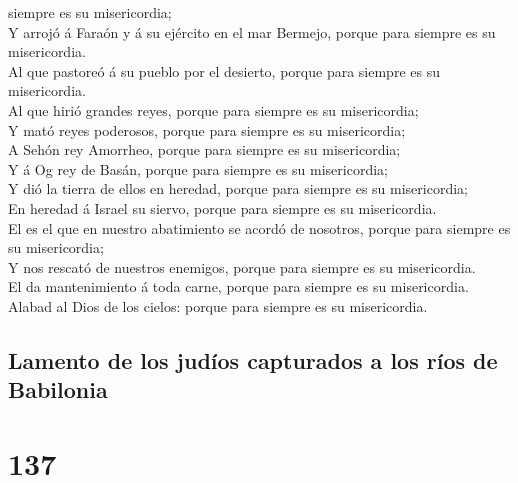 siempre es su misericordia;\\
 Y arrojó á Faraón y á su ejército en el mar Bermejo,
porque para siempre es su misericordia.\\
 Al que pastoreó á su pueblo por el desierto, porque para
siempre es su misericordia.\\
 Al que hirió grandes reyes, porque para siempre es su
misericordia;\\
 Y mató reyes poderosos, porque para siempre es su
misericordia;\\
 A Sehón rey Amorrheo, porque para siempre es su
misericordia;\\
 Y á Og rey de Basán, porque para siempre es su
misericordia;\\
 Y dió la tierra de ellos en heredad, porque para siempre
es su misericordia;\\
 En heredad á Israel su siervo, porque para siempre es su
misericordia.\\
 El es el que en nuestro abatimiento se acordó de
nosotros, porque para siempre es su misericordia;\\
 Y nos rescató de nuestros enemigos, porque para siempre
es su misericordia.\\
 El da mantenimiento á toda carne, porque para siempre es
su misericordia.\\
 Alabad al Dios de los cielos: porque para siempre es su
misericordia.

\hypertarget{lamento-de-los-juduxedos-capturados-a-los-ruxedos-de-babilonia}{%
\subsection{Lamento de los judíos capturados a los ríos de
Babilonia}\label{lamento-de-los-juduxedos-capturados-a-los-ruxedos-de-babilonia}}

\hypertarget{section-136}{%
\section{137}\label{section-136}}

